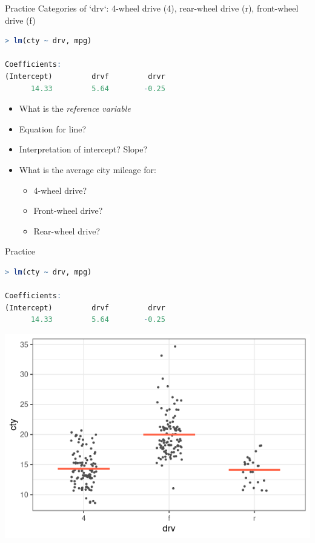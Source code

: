 \documentclass{beamer}
\begin{document}
\begin{frame}[fragile]{Practice}
\footnotesize
Categories of `drv`: 4-wheel drive (4), rear-wheel drive (r), front-wheel drive (f)
\begin{lstlisting}[language=R]
> lm(cty ~ drv, mpg)

Coefficients:
(Intercept)         drvf         drvr  
      14.33         5.64        -0.25  
\end{lstlisting}

\begin{itemize}
\item What is the \textit{reference variable}
\item Equation for line?
\item Interpretation of intercept? Slope?
\item What is the average city mileage for:
\begin{itemize}\footnotesize
	\item 4-wheel drive?
	\item Front-wheel drive?
	\item Rear-wheel drive?
\end{itemize}
\end{itemize}

\end{frame}



\begin{frame}[fragile]{Practice}
\footnotesize
\begin{lstlisting}[language=R]
> lm(cty ~ drv, mpg)

Coefficients:
(Intercept)         drvf         drvr  
      14.33         5.64        -0.25  
\end{lstlisting}

\begin{center}
\includegraphics[scale=0.4]{cat_reg2.png}
\end{center}
\end{frame}
\end{document}
